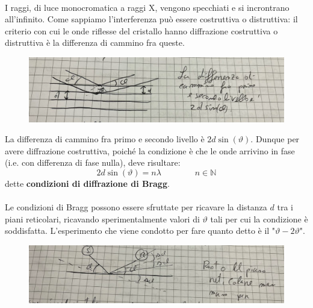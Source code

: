 \documentclass{book}
\begin{document}
            \paragraph{}
                I raggi, di luce monocromatica a raggi X, vengono specchiati e si incrontrano all'infinito. Come sappiamo l'interferenza può essere costruttiva o distruttiva: il criterio con cui le onde riflesse del cristallo hanno diffrazione costruttiva o distruttiva è la differenza di cammino fra queste.
                    \begin{figure}[h!]
                        \centering
                        \includegraphics[width=0.75\linewidth]{img/diffCamminoLez8.png}
                       
                    \end{figure}
            \newline
            La differenza di cammino fra primo e secondo livello è $2d\sin(\vartheta)$.
            \newpage
            Dunque per avere diffrazione costruttiva, poiché la condizione è che le onde arrivino in fase (i.e. con differenza di fase nulla), deve risultare:
            $$2d\sin{(\vartheta)} = n \lambda \qquad \qquad n \in \mathbb{N}$$
            dette \textbf{condizioni di diffrazione di Bragg}.

            \paragraph{}
                Le condizioni di Bragg possono essere sfruttate per ricavare la distanza $d$ tra i piani reticolari, ricavando sperimentalmente valori di $\vartheta$ tali per cui la condizione è soddisfatta.\newline
                L'esperimento che viene condotto per fare quanto detto è il "$\vartheta-2\vartheta$". 
                \begin{figure}[h!]
                    \centering
                    \includegraphics[width=0.85\linewidth]{img/theta2thetaLez8.png}
                \end{figure}
\end{document}
